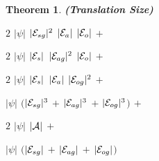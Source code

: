 \documentclass[11pt]{report}
\newtheorem{vvtheorem}{Theorem}[chapter]
\newenvironment{vtheorem}[1]
{
  \begin{vvtheorem}{{\bf (#1)}}
}
{
  \end{vvtheorem}
}
\newenvironment{vquote}
{
  \begin{list}{}{\leftmargin 1em}\item[]
}
{
  \end{list}
}
\begin{document}
\begin{vtheorem}{Translation Size}
\begin{vquote}
            \hspace{1em}
            $2$ $|\psi|$ $|{\cal E}_{sg}|^{2}$ $|{\cal E}_{a}|$ $|{\cal E}_{o}|$ $+$

            \hspace{1em}
            $2$ $|\psi|$ $|{\cal E}_{s}|$ $|{\cal E}_{ag}|^{2}$ $|{\cal E}_{o}|$ $+$

            \hspace{1em}
            $2$ $|\psi|$ $|{\cal E}_{s}|$ $|{\cal E}_{a}|$ $|{\cal E}_{og}|^{2}$ $+$

            \hspace{1em}
            $|\psi|$
            $($$|{\cal E}_{sg}|^{3}$ $+$
            $|{\cal E}_{ag}|^{3}$ $+$
            $|{\cal E}_{og}|^{3}$$)$ $+$

            \hspace{1em}
            $2$ $|\psi|$ $|{\cal A}|$ $+$

            \hspace{1em}
            $|\psi|$
            $($$|{\cal E}_{sg}|$ $+$ $|{\cal E}_{ag}|$ $+$ $|{\cal E}_{og}|$$)$
          \end{vquote}
        \end{vtheorem}
\end{document}

